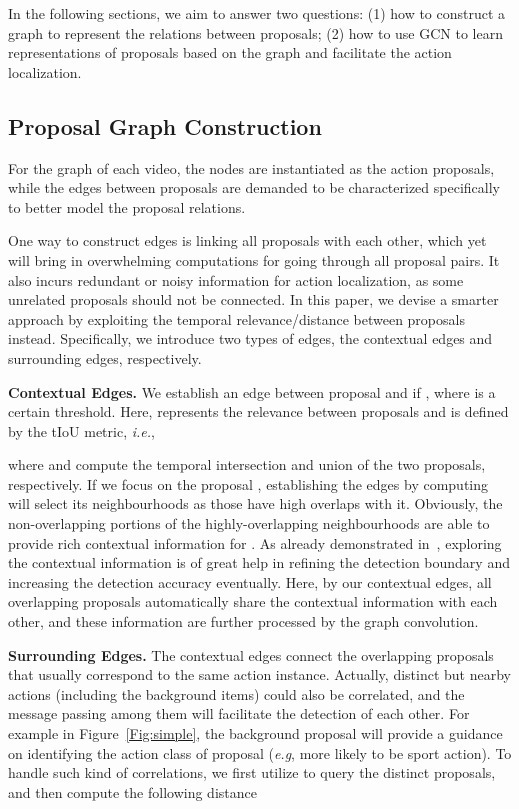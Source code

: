 \documentclass[10pt,twocolumn,letterpaper]{article}
\def\eg{\emph{e.g}\onedot} \def\Eg{\emph{E.g}\onedot}
\begin{document}
	In the following sections, we aim to answer two questions: (1) how to construct a graph to represent the relations between proposals; (2) how to use GCN to learn representations of proposals based on the graph and facilitate the action localization. 
	
	
	\subsection{Proposal Graph Construction}
	\label{Sec:construct}
	
For the graph  of each video, the nodes are instantiated as the action proposals, while the edges  between proposals are demanded to be characterized specifically to better model the proposal relations.


	One way to construct edges is linking all proposals with each other, which yet will bring in overwhelming computations for going through all proposal pairs. It also incurs redundant or noisy information for action localization, as some unrelated proposals should not be connected. In this paper, we devise a smarter approach by exploiting the temporal relevance/distance between proposals instead. Specifically, we introduce two types of edges, the contextual edges and surrounding edges, respectively. 










	\noindent \textbf{Contextual Edges.}
We establish an edge between proposal  and  if , where  is a certain threshold.
	Here,  represents the relevance between proposals and is defined by the tIoU metric, \emph{i.e.}, 
	
	where  and  compute the temporal intersection and union of the two proposals, respectively. If we focus on the proposal , establishing the edges by computing  will select its neighbourhoods as those have high overlaps with it.  
	Obviously, the non-overlapping portions of the highly-overlapping neighbourhoods are able to provide rich contextual information for . As already demonstrated in~\cite{dai2017temporal,chao2018rethinking}, exploring the contextual information is of great help in refining the detection boundary and increasing the detection accuracy eventually. Here, by our contextual edges, all overlapping proposals automatically share the contextual information with each other, and these information are further processed by the graph convolution.
	
	
	\noindent\textbf{Surrounding Edges.} 
The contextual edges connect the overlapping proposals that usually correspond to the same action instance. Actually, distinct but nearby actions (including the background items) could also be correlated, and the message passing among them will facilitate the detection of each other. 
	For example in Figure~\ref{Fig:simple}, the background proposal  will provide a guidance on identifying the action class of proposal  (\eg, more likely to be sport action).
	To handle such kind of correlations, we first utilize  to query the distinct proposals, and then compute the following distance 
	
\end{document}
